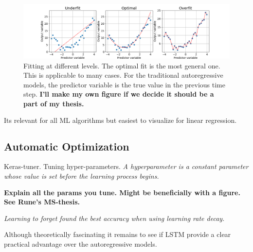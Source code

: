 \documentclass{article}
\begin{document}
\begin{figure}[hp]
    \centering
    \includegraphics[scale = 0.5]{generalization.png}
    \caption{Fitting at different levels. The optimal fit is the most general one. This is applicable to many cases. For the traditional autoregressive models, the predictor variable is the true value in the previous time step. \textbf{I'll make my own figure if we decide it should be a part of my thesis.}}
    \label{fig:linreg_overfitting}
\end{figure}

Its relevant for all ML algorithms but easiest to visualize for linear regression.


\subsection{Automatic Optimization} \label{sec:hyperparam_tuning}
Keras-tuner. Tuning hyper-parameters.
\textit{A hyperparameter is a constant parameter whose value is set before the learning process begins.}

\textbf{Explain all the params you tune. Might be beneficially with a figure. See Rune's MS-thesis.}

\textit{Learning to forget found the best accuracy when using learning rate decay.}


Although theoretically fascinating it remains to see if LSTM provide a clear practical advantage over the autoregressive models.


%
%
\end{document}
